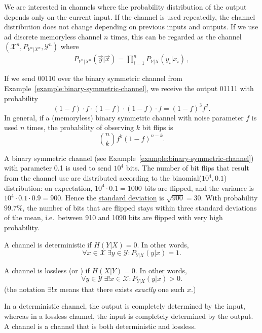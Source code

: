 We are interested in  channels where the probability distribution of the output depends only on the current input. If the channel is used repeatedly, the channel distribution does not change depending on previous inputs and outputs.
If we use ad discrete memoryless channel $n$ times, this can be regarded as the channel $(\mathcal{X}^n, P_{Y^n|X^n}, \mathcal{Y}^n)$ where
\begin{align}
P_{Y^n|X^n}(\vec{y}|\vec{x}) = \prod_{i=1}^n P_{Y|X}(y_i|x_i) \, ,
\end{align}


\begin{example}
If we send 00110 over the binary symmetric channel from Example~\ref{example:binary-symmetric-channel}, we receive the output 01111 with probability
\[
(1-f) \cdot f \cdot (1-f) \cdot (1-f) \cdot f = (1-f)^3f^2.
\]
In general, if a (memoryless) binary symmetric channel with noise parameter $f$ is used $n$ times, the probability of observing $k$ bit flips is
\[
{n \choose k} f^{k} (1-f)^{n-k}.
\]
\end{example}

\begin{example}
A binary symmetric channel (see
Example~\ref{example:binary-symmetric-channel}) with parameter 0.1 is
used to send $10^4$ bits. The number of bit flips that result from the channel use are distributed according to the binomial($10^4,0.1$) distribution: on expectation, $10^4 \cdot 0.1 = 1000$ bits are flipped, and the variance is $10^4 \cdot 0.1 \cdot 0.9 = 900$. Hence the \href{https://en.wikipedia.org/wiki/Standard_deviation}{standard deviation} is $\sqrt{900} = 30$. With probability 99.7$\%$, the number of bits that are flipped stays within three standard deviations of the mean, i.e.\ between 910 and 1090 bits are flipped with very high probability.
\end{example}

\begin{definition}
A channel is deterministic if $H(Y|X) = 0$. In other words,
\[
\forall x \in \mathcal{X}\  \exists y \in \mathcal{Y}: P_{Y|X}(y|x) = 1.
\]
\end{definition}
\begin{definition}
A channel is lossless (or ) if $H(X|Y) = 0$. In other words,
\[
\forall y \in \mathcal{Y}\  \exists! x \in \mathcal{X}: P_{Y|X}(y|x) > 0.
\]
(the notation $\exists!x$ means that there exists \emph{exactly} one such $x$.)
\end{definition}
In a deterministic channel, the output is completely determined by the input, whereas in a lossless channel, the input is completely determined by the output.
A  channel is a channel that is both deterministic and lossless.

